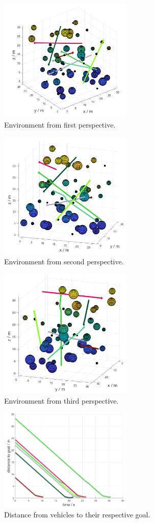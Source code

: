 \documentclass[journal]{IEEEtran}
\begin{document}
	\begin{figure}[h]
			\centering
			\includegraphics[width=2.5in]{Results/Potentialfields/env_1}
			\caption{Environment from first perspective.}
			\label{fig:env_1}
		\end{figure}	
		\begin{figure}[h]
			\centering
			\includegraphics[width=2.5in]{Results/Potentialfields/env_2}
			\caption{Environment from second perspective.}
			\label{fig:env_2}
		\end{figure}	
		\begin{figure}[h]
			\centering
			\includegraphics[width=2.5in]{Results/Potentialfields/env_3}
			\caption{Environment from third perspective.}
			\label{fig:env_3}
		\end{figure}	
		\begin{figure}[h]
			\centering
			\includegraphics[width=2.5in]{Results/Potentialfields/goal}
			\caption{Distance from vehicles to their respective goal.}
			\label{fig:goal}
		\end{figure}
\end{document}

